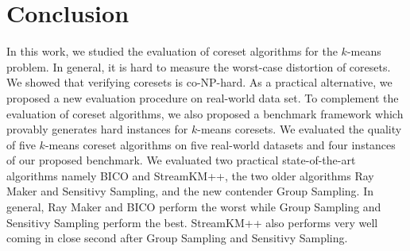 \section{Conclusion} \label{sec:conclusion}
In this work, we studied the evaluation of coreset algorithms for the $k$-means problem. In general, it is hard to measure the worst-case distortion of coresets. We showed that verifying coresets is co-NP-hard. As a practical alternative, we proposed a new evaluation procedure on real-world data set. To complement the evaluation of coreset algorithms, we also proposed a benchmark framework which provably generates hard instances for $k$-means coresets. 
We evaluated the quality of five $k$-means coreset algorithms on five real-world datasets and four instances of our proposed benchmark. We evaluated two practical state-of-the-art algorithms namely BICO and StreamKM++, the two older algorithms Ray Maker and Sensitivy Sampling, and the new contender Group Sampling. In general, Ray Maker and BICO perform the worst while Group Sampling and Sensitivy Sampling perform the best. StreamKM++ also performs very well coming in close second after Group Sampling and Sensitivy Sampling.
